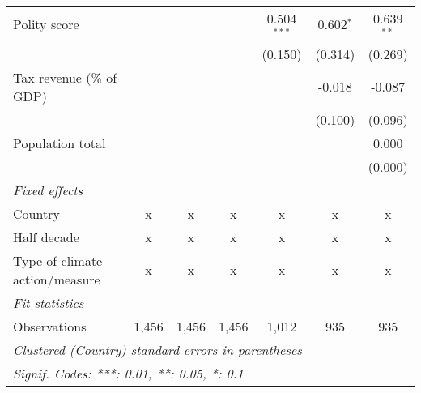\begin{tabular}{lcccccc}
   Polity score                                                    &                &                &                & 0.504$^{***}$ & 0.602$^{*}$  & 0.639$^{**}$\\   
                                                                   &                &                &                & (0.150)       & (0.314)      & (0.269)\\   
   Tax revenue (\% of GDP)                                         &                &                &                &               & -0.018       & -0.087\\   
                                                                   &                &                &                &               & (0.100)      & (0.096)\\   
   Population total                                                &                &                &                &               &              & 0.000\\   
                                                                   &                &                &                &               &              & (0.000)\\   
   \emph{Fixed effects}\\
   Country                                                         & x              & x              & x              & x             & x            & x\\  
   Half decade                                                     & x              & x              & x              & x             & x            & x\\  
   Type of climate action/measure                                  & x              & x              & x              & x             & x            & x\\  
   \midrule \emph{Fit statistics}\\
   Observations                                                    & 1,456          & 1,456          & 1,456          & 1,012         & 935          & 935\\  
   \midrule
   \multicolumn{7}{l}{\emph{Clustered (Country) standard-errors in parentheses}}\\
   \multicolumn{7}{l}{\emph{Signif. Codes: ***: 0.01, **: 0.05, *: 0.1}}\\
\end{tabular}
\par\endgroup


